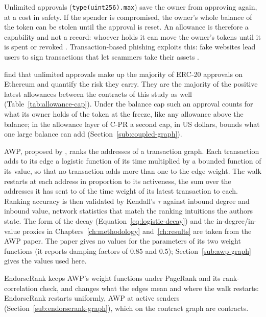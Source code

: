 
Unlimited approvals (\texttt{type(uint256).max}) save the owner from approving again, at a cost in safety. If the spender is compromised, the owner's whole balance of the token can be stolen until the approval is reset. An allowance is therefore a capability and not a record: whoever holds it can move the owner's tokens until it is spent or revoked \parencite{vogelsteller2015erc20}. Transaction-based phishing exploits this: fake websites lead users to sign transactions that let scammers take their assets \parencite{he2023txphishscope}.

\textcite{wang2022unlimited} find that unlimited approvals make up the majority of ERC-20 approvals on Ethereum and quantify the risk they carry. They are the majority of the positive latest allowances between the contracts of this study as well (Table~\ref{tab:allowance-cap}). Under the balance cap such an approval counts for what its owner holds of the token at the freeze, like any allowance above the balance; in the allowance layer of \mbox{C-PR} a second cap, in US dollars, bounds what one large balance can add (Section~\ref{sub:coupled-graph}).


AWP, proposed by \textcite{do2023awp}, ranks the addresses of a transaction graph. Each transaction adds to its edge a logistic function of its time multiplied by a bounded function of its value, so that no transaction adds more than one to the edge weight. The walk restarts at each address in proportion to its activeness, the sum over the addresses it has sent to of the time weight of its latest transaction to each. Ranking accuracy is then validated by Kendall's $\tau$ against inbound degree and inbound value, network statistics that match the ranking intuitions the authors state. The form of the decay (Equation~\eqref{eq:logistic-decay}) and the in-degree/in-value proxies in Chapters~\ref{ch:methodology} and~\ref{ch:results} are taken from the AWP paper. The paper gives no values for the parameters of its two weight functions (it reports damping factors of $0.85$ and $0.5$); Section~\ref{sub:awp-graph} gives the values used here.

EndorseRank keeps AWP's weight functions under PageRank and its rank-correlation check, and changes what the edges mean and where the walk restarts: EndorseRank restarts uniformly, AWP at active senders (Section~\ref{sub:endorserank-graph}), which on the contract graph are contracts.

